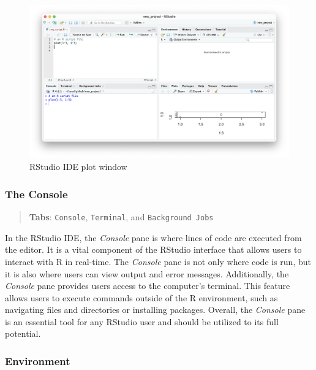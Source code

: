 \documentclass[
]{book}
\begin{document}
\begin{figure}
\includegraphics[width=31.94in]{images/02_024_qplot} \caption{\label{fig:2024}RStudio IDE plot window}\label{fig:2024}
\end{figure}

\hypertarget{the-console}{%
\subsubsection*{The Console}\label{the-console}}

\begin{quote}
\textbf{Tabs}: \texttt{Console}, \texttt{Terminal}, and \texttt{Background\ Jobs}
\end{quote}

In the RStudio IDE, the \emph{Console} pane is where lines of code are executed from the editor. It is a vital component of the RStudio interface that allows users to interact with R in real-time. The \emph{Console} pane is not only where code is run, but it is also where users can view output and error messages. Additionally, the \emph{Console} pane provides users access to the computer's terminal. This feature allows users to execute commands outside of the R environment, such as navigating files and directories or installing packages. Overall, the \emph{Console} pane is an essential tool for any RStudio user and should be utilized to its full potential.

\hypertarget{environment}{%
\subsubsection*{Environment}\label{environment}}
\end{document}
